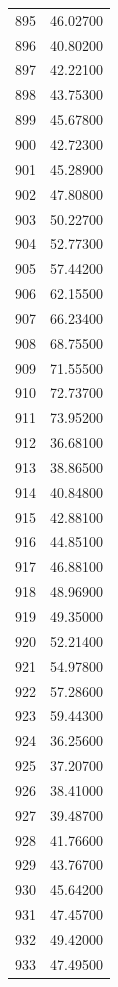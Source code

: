 \documentclass[
  letterpaper,
  DIV=11,
  numbers=noendperiod]{scrreprt}
\begin{document}
\begin{tcolorbox}
\begin{tabular}{lr}
895  &         46.02700 \\
896  &         40.80200 \\
897  &         42.22100 \\
898  &         43.75300 \\
899  &         45.67800 \\
900  &         42.72300 \\
901  &         45.28900 \\
902  &         47.80800 \\
903  &         50.22700 \\
904  &         52.77300 \\
905  &         57.44200 \\
906  &         62.15500 \\
907  &         66.23400 \\
908  &         68.75500 \\
909  &         71.55500 \\
910  &         72.73700 \\
911  &         73.95200 \\
912  &         36.68100 \\
913  &         38.86500 \\
914  &         40.84800 \\
915  &         42.88100 \\
916  &         44.85100 \\
917  &         46.88100 \\
918  &         48.96900 \\
919  &         49.35000 \\
920  &         52.21400 \\
921  &         54.97800 \\
922  &         57.28600 \\
923  &         59.44300 \\
924  &         36.25600 \\
925  &         37.20700 \\
926  &         38.41000 \\
927  &         39.48700 \\
928  &         41.76600 \\
929  &         43.76700 \\
930  &         45.64200 \\
931  &         47.45700 \\
932  &         49.42000 \\
933  &         47.49500 \\

\end{tabular}
\end{tcolorbox}
\end{document}
